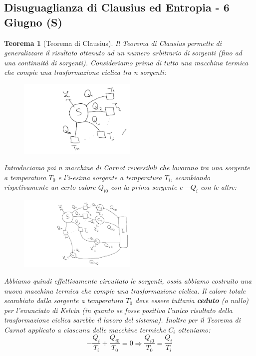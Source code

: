 \documentclass{article}
\newtheorem{thm}{Teorema}[section]
\newcommand{\then}{\ensuremath{\Rightarrow}}
\begin{document}
\subsection{Disuguaglianza di Clausius ed Entropia - 6 Giugno (S)}
\begin{thm}[Teorema di Clausius]
Il Teorema di Clausius permette di generalizzare il risultato ottenuto ad un numero arbitrario di sorgenti (fino ad una continuità di sorgenti). Consideriamo prima di tutto una macchina termica che compie una trasformazione ciclica tra n sorgenti:
\begin{figure}[H]
    \centering
    \includegraphics[width=0.5\textwidth]{TeoremaClausius1.png}
    \label{TeoremaClausius1}
\end{figure}
Introduciamo poi n macchine di Carnot reversibili che lavorano tra una sorgente a temperatura $T_0$ e l'i-esima sorgente a temperatura $T_i$, scambiando rispetivamente un certo calore $Q_{i0}$ con la prima sorgente e $-Q_i$ con le altre:
\begin{figure}[H]
    \centering
    \includegraphics[width=0.5\textwidth]{TeoremaClausius2.png}
    \label{TeoremaClausius2}
\end{figure}
Abbiamo quindi effettivamente circuitato le sorgenti, ossia abbiamo costruito una nuova macchina termica che compie una trasformazione ciclica. Il calore totale scambiato dalla sorgente a temperatura $T_0$ deve essere tuttavia \textbf{ceduto} (o nullo) per l'enunciato di Kelvin (in quanto se fosse positivo l'unico risultato della trasformazione ciclica sarebbe il lavoro del sistema). Inoltre per il Teorema di Carnot applicato a ciascuna delle macchine termiche $C_i$ otteniamo:
\[-\frac{Q_i}{T_i}+\frac{Q_{i0}}{T_0}=0\then \frac{Q_{i0}}{T_0}=\frac{Q_i}{T_i}\]

\end{thm}
\end{document}
